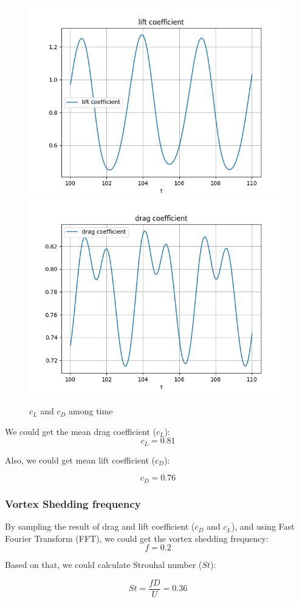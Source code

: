 \documentclass[12pt]{article}
\begin{document}
\begin{figure}[H]
    \centering
    \includegraphics[width=0.45\linewidth]{figure/Analysis/Ellipt_N32_Re300_8x4/cl_Ellipt_N32_Re300_8x4.jpg}
    \includegraphics[width=0.45\linewidth]{figure/Analysis/Ellipt_N32_Re300_8x4/cd_Ellipt_N32_Re300_8x4.jpg}
    \caption{$c_L$ and $c_D$ among time}
\end{figure}

We could get the mean drag coefficient ($c_L$):
$$c_L = 0.81$$


Also, we could get mean lift coefficient ($c_D$):

$$c_D = 0.76$$



\subsubsection{Vortex Shedding frequency}

By sampling the result of drag and lift coefficient ($c_D$ and $c_L$), and using Fast Fourier Transform (FFT), we could get the vortex shedding frequency:
$$f = 0.2$$

Based on that, we could calculate Strouhal number ($St$):

$$St = \frac{f D}{U} = 0.36 $$
\end{document}
